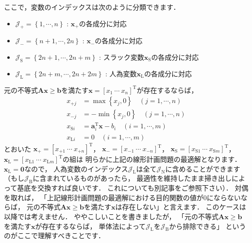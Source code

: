 ﻿\documentclass{jsarticle}
\begin{document}
ここで，変数のインデックスは次のように分類できます．
\begin{itemize}
\item $\mathcal{J}_{+}        =\left\{   1,\cdots, n   \right\}$ : $\boldsymbol{x}_{+}$の各成分に対応
\item $\mathcal{J}_{-}        =\left\{ n+1,\cdots,2n   \right\}$ : $\boldsymbol{x}_{-}$の各成分に対応
\item $\mathcal{J}_{\mathrm{S}}=\left\{2n+1,\cdots,2n+ m\right\}$ : スラック変数$\boldsymbol{x}_{\mathrm{S}}$の各成分に対応
\item $\mathcal{J}_{\mathrm{L}}=\left\{2n+m,\cdots,2n+2m\right\}$ : 人為変数$\boldsymbol{x}_{\mathrm{L}}$の各成分に対応
\end{itemize}
元の不等式$\boldsymbol{A}\boldsymbol{x}\geq\boldsymbol{b}$を満たす$\boldsymbol{x}=\left[x_{1}~\cdots~x_{n}\right]^{\mathrm{T}}$が存在するならば，
\begin{align*}
x_{+j}&=\max\left\{x_{j},0\right\} \quad (j=1,\cdots,n)\\
x_{-j}&=-\min\left\{x_{j},0\right\} \quad (j=1,\cdots,n) \\
x_{\mathrm{S}i}&=\boldsymbol{a}_{i}^{\mathrm{T}}\boldsymbol{x}-b_{i} \quad (i=1,\cdots,m) \\
x_{\mathrm{L}i}&=0 \quad (i=1,\cdots,m)
\end{align*}
とおいた
$\boldsymbol{x}_{+}=\left[x_{+1}~\cdots~x_{+n}\right]^{\mathrm{T}}$，
$\boldsymbol{x}_{-}=\left[x_{-1}~\cdots~x_{-n}\right]^{\mathrm{T}}$，
$\boldsymbol{x}_{\mathrm{S}}=\left[x_{\mathrm{S}1}~\cdots~x_{\mathrm{S}m}\right]^{\mathrm{T}}$，
$\boldsymbol{x}_{\mathrm{L}}=\left[x_{\mathrm{L}1}~\cdots~x_{\mathrm{L}m}\right]^{\mathrm{T}}$の組は
明らかに上記の線形計画問題の最適解となります．
$\boldsymbol{x}_{\mathrm{L}}=\boldsymbol{0}$なので，
人為変数のインデックス$\mathcal{J}_{\mathrm{L}}$は全て$\mathcal{J}_{\mathrm{N}}$に含めることができます
（もし$\mathcal{J}_{\mathrm{B}}$に含まれているものがあったら，
最適性を維持したまま掃き出しによって基底を交換すれば良いです．
これについても別記事をご参照下さい）．
対偶を取れば，
「上記線形計画問題の最適解における目的関数の値が$0$にならないならば，
元の不等式$\boldsymbol{A}\boldsymbol{x}\geq\boldsymbol{b}$を満たす$\boldsymbol{x}$は存在しない」と言えます．
このケースは以降では考えません．
ややこしいことを書きましたが，
「元の不等式$\boldsymbol{A}\boldsymbol{x}\geq\boldsymbol{b}$を満たす$\boldsymbol{x}$が存在するならば，
単体法によって$\mathcal{J}_{\mathrm{L}}$を$\mathcal{J}_{\mathrm{B}}$から排除できる」
というのがここで理解すべきことです．
\end{document}
